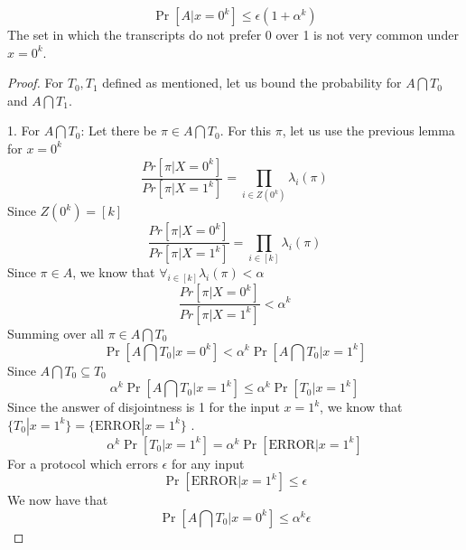 \begin{lemma}
    \begin{equation*}
        \Pr[A| x = 0^k] \leq \epsilon (1 + \alpha ^k)
    \end{equation*}
    The set in which the transcripts do not prefer 0 over 1 is not very common under $x = 0^k$.
\end{lemma}
\begin{proof}
For $T_0, T_1$ defined as mentioned, let us bound the probability for $A \bigcap T_0$ and $A \bigcap T_1$. \newline

1. For $A \bigcap T_0$: \newline
Let there be $\pi \in A \bigcap T_0$. \newline
For this $\pi$, let us use the previous lemma for $x = 0^k$
\begin{equation*}
    \frac{Pr[\pi | X = 0^k]}{Pr[\pi | X = 1^k]} = \prod_{i \in Z(0^k)} \lambda_i(\pi)
\end{equation*}
Since $Z(0^k) = [k]$
\begin{equation*}
    \frac{Pr[\pi | X = 0^k]}{Pr[\pi | X = 1^k]} = \prod_{i \in [k]} \lambda_i(\pi)
\end{equation*}
Since $\pi \in A$, we know that $\forall_{i \in [k]}\lambda_i(\pi) < \alpha$
\begin{equation*}
    \frac{Pr[\pi | X = 0^k]}{Pr[\pi | X = 1^k]} < \alpha^{k}
\end{equation*}
Summing over all $\pi \in A \bigcap T_0 $
\begin{equation*}
    \Pr[A \bigcap T_0 | x = 0^k] < \alpha ^k \Pr[A \bigcap T_0 | x = 1^k]
\end{equation*}
Since $A \bigcap T_0 \subseteq T_0$
\begin{equation*}
    \alpha ^k \Pr[A \bigcap T_0 | x = 1^k] \leq \alpha ^k \Pr[T_0 | x = 1^k]
\end{equation*}
Since the answer of disjointness is 1 for the input $x=1^k$, we know that $\{T_0 | x=1^k\} = \{\text{ERROR} | x=1^k\}$ .
\begin{equation*}
    \alpha ^k \Pr[T_0 | x = 1^k] = \alpha ^k \Pr[\text{ERROR} | x = 1^k]
\end{equation*}
For a protocol which errors $\epsilon$ for any input
\begin{equation*}
    \Pr[\text{ERROR} | x = 1^k] \leq \epsilon
\end{equation*}
We now have that 
\begin{equation*}
    \Pr[A \bigcap T_0 | x = 0^k] \leq \alpha^k \epsilon

\end{equation*}
\end{proof}

